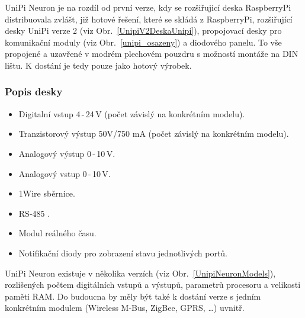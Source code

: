 UniPi Neuron je na rozdíl od první verze, kdy se rozšiřujicí deska RaspberryPi distribuovala zvlášt, již hotové řešení, které se skládá z RaspberryPi, rozšiřující desky UniPi verze 2 (viz Obr.~\ref{UnipiV2DeskaUnipi}), propojovací desky pro komunikační moduly (viz Obr.~\ref{unipi_osazeny}) a diodového panelu. To vše propojené a uzavřené v modrém plechovém pouzdru s možností montáže na DIN lištu. K dostání je tedy pouze jako hotový výrobek.


\subsubsection{Popis desky}
\begin{itemize}
\item Digitalní vstup 4\,-\,24\,V (počet závislý na konkrétním modelu).
\item Tranzistorový výstup 50V/750 mA (počet závislý na konkrétním modelu).
\item Analogový výstup 0\,-\,10\,V.
\item Analogový vstup 0\,-\,10\,V.
\item 1Wire sběrnice.
\item RS-485 .
\item Modul reálného času.
\item Notifikační diody pro zobrazení stavu jednotlivých portů.
\end{itemize}

\vspace{10pt}
UniPi Neuron existuje v několika verzích (viz Obr.~\ref{UnipiNeuronModels}), rozlišených počtem digitálních vstupů a výstupů, parametrů procesoru a velikosti paměti RAM. Do budoucna by měly být také k dostání verze s jedním konkrétním modulem (Wireless M-Bus, ZigBee, GPRS, \ldots) uvnitř.

